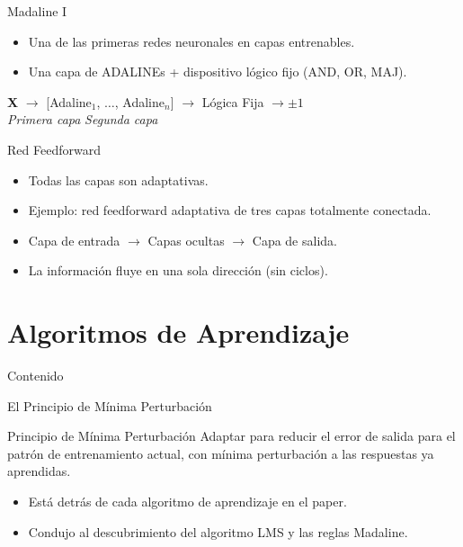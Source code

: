 \documentclass[aspectratio=169,utf8,spanish]{beamer}
\begin{document}
\begin{frame}{Madaline I}
  \begin{itemize}
    \item Una de las primeras redes neuronales en capas entrenables.
    \item Una capa de ADALINEs + dispositivo lógico fijo (AND, OR, MAJ).
  \end{itemize}
  \begin{center}
    \textbf{X} $\to$ [Adaline$_1$, $\ldots$, Adaline$_n$] $\to$ Lógica Fija $\to \pm 1$\\
    \small{\textit{Primera capa} \hspace{3cm} \textit{Segunda capa}}
  \end{center}
\end{frame}

\begin{frame}{Red Feedforward}
  \begin{itemize}
    \item Todas las capas son adaptativas.
    \item Ejemplo: red feedforward adaptativa de tres capas totalmente conectada.
  \end{itemize}
  \begin{itemize}
    \item Capa de entrada $\to$ Capas ocultas $\to$ Capa de salida.
    \item La información fluye en una sola dirección (sin ciclos).
  \end{itemize}
\end{frame}

\section{Algoritmos de Aprendizaje}

\begin{frame}{Contenido}
\end{frame}


\begin{frame}{El Principio de Mínima Perturbación}
  \begin{block}{Principio de Mínima Perturbación}
    Adaptar para reducir el error de salida para el patrón de entrenamiento actual, con mínima perturbación a las respuestas ya aprendidas.
  \end{block}
  \begin{itemize}
    \item Está detrás de cada algoritmo de aprendizaje en el paper.
    \item Condujo al descubrimiento del algoritmo LMS y las reglas Madaline.
  \end{itemize}
\end{frame}
\end{document}
